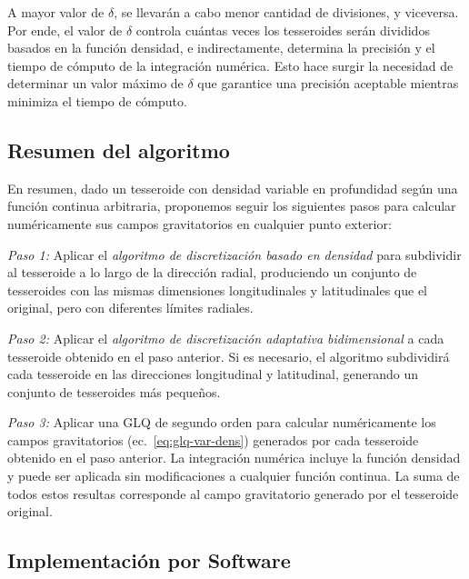 A mayor valor de $\delta$, se llevarán a cabo menor cantidad de divisiones,
y viceversa.
Por ende, el valor de $\delta$ controla cuántas veces los tesseroides serán
divididos basados en la función densidad, e indirectamente, determina la
precisión y el tiempo de cómputo de la integración numérica.
Esto hace surgir la necesidad de determinar un valor máximo de $\delta$ que
garantice una precisión aceptable mientras minimiza el tiempo de cómputo.


\subsection{Resumen del algoritmo}

En resumen, dado un tesseroide con densidad variable en profundidad según una
función continua arbitraria, proponemos seguir los siguientes pasos para
calcular numéricamente sus campos gravitatorios en cualquier punto exterior:

\textit{Paso 1:}
Aplicar el \emph{algoritmo de discretización basado en densidad} para
subdividir al tesseroide a lo largo de la dirección radial, produciendo un
conjunto de tesseroides con las mismas dimensiones longitudinales
y latitudinales que el original, pero con diferentes límites radiales.

\textit{Paso 2:}
Aplicar el \emph{algoritmo de discretización adaptativa bidimensional} a cada
tesseroide obtenido en el paso anterior.
Si es necesario, el algoritmo subdividirá cada tesseroide en las direcciones
longitudinal y latitudinal, generando un conjunto de tesseroides más pequeños.

\textit{Paso 3:}
Aplicar una \ac{GLQ} de segundo orden para calcular numéricamente los campos
gravitatorios (ec.~\ref{eq:glq-var-dens}) generados por cada tesseroide
obtenido en el paso anterior. La integración numérica incluye la función
densidad y puede ser aplicada sin modificaciones a cualquier función continua.
La suma de todos estos resultas corresponde al campo gravitatorio generado por
el tesseroide original.


\subsection{Implementación por Software}

